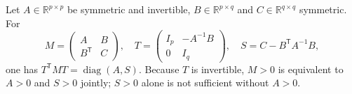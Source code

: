 Let $A\in\mathbb R^{p\times p}$ be symmetric and invertible,
$B\in\mathbb R^{p\times q}$ and $C\in\mathbb R^{q\times q}$ symmetric.
For
\[
 M=\begin{pmatrix}A&B\\B^{\mathsf T}&C\end{pmatrix},\quad
 T=\begin{pmatrix}I_p&-A^{-1}B\\0&I_q\end{pmatrix},\quad
 S=C-B^{\mathsf T}A^{-1}B,
\]
one has $T^{\mathsf T}MT=\operatorname{diag}(A,S)$.
Because $T$ is invertible, $M>0$ is equivalent to $A>0$ and $S>0$ jointly;
$S>0$ alone is not sufficient without $A>0$.